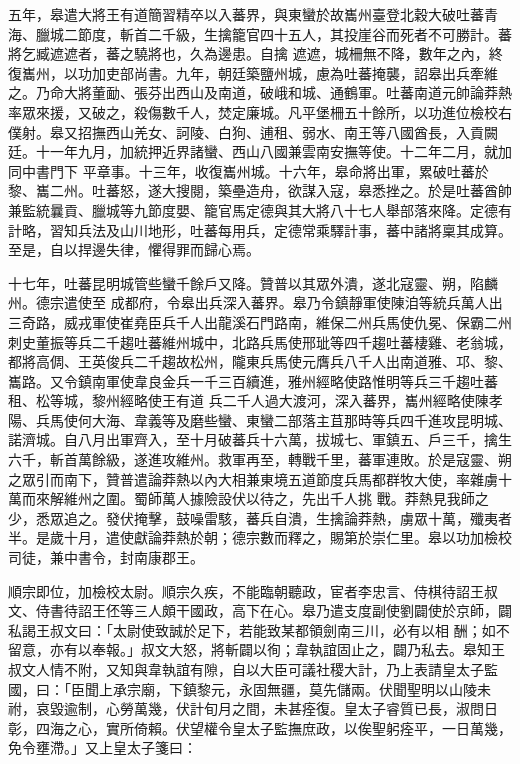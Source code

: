 \begin{pinyinscope}
 五年，皋遣大將王有道簡習精卒以入蕃界，與東蠻於故巂州臺登北穀大破吐蕃青海、臘城二節度，斬首二千級，生擒籠官四十五人，其投崖谷而死者不可勝計。蕃將乞臧遮遮者，蕃之驍將也，久為邊患。自擒
 遮遮，城柵無不降，數年之內，終復巂州，以功加吏部尚書。九年，朝廷築鹽州城，慮為吐蕃掩襲，詔皋出兵牽維之。乃命大將董勔、張芬出西山及南道，破峨和城、通鶴軍。吐蕃南道元帥論莽熱率眾來援，又破之，殺傷數千人，焚定廉城。凡平堡柵五十餘所，以功進位檢校右僕射。皋又招撫西山羌女、訶陵、白狗、逋租、弱水、南王等八國酋長，入貢闕廷。十一年九月，加統押近界諸蠻、西山八國兼雲南安撫等使。十二年二月，就加同中書門下
 平章事。十三年，收復巂州城。十六年，皋命將出軍，累破吐蕃於黎、巂二州。吐蕃怒，遂大搜閱，築壘造舟，欲謀入寇，皋悉挫之。於是吐蕃酋帥兼監統曩貢、臘城等九節度嬰、籠官馬定德與其大將八十七人舉部落來降。定德有計略，習知兵法及山川地形，吐蕃每用兵，定德常乘驛計事，蕃中諸將稟其成算。至是，自以捍邊失律，懼得罪而歸心焉。



 十七年，吐蕃昆明城管些蠻千餘戶又降。贊普以其眾外潰，遂北寇靈、朔，陷麟州。德宗遣使至
 成都府，令皋出兵深入蕃界。皋乃令鎮靜軍使陳洎等統兵萬人出三奇路，威戎軍使崔堯臣兵千人出龍溪石門路南，維保二州兵馬使仇冕、保霸二州刺史董振等兵二千趨吐蕃維州城中，北路兵馬使邢玼等四千趨吐蕃棲雞、老翁城，都將高倜、王英俊兵二千趨故松州，隴東兵馬使元膺兵八千人出南道雅、邛、黎、巂路。又令鎮南軍使韋良金兵一千三百續進，雅州經略使路惟明等兵三千趨吐蕃租、松等城，黎州經略使王有道
 兵二千人過大渡河，深入蕃界，巂州經略使陳孝陽、兵馬使何大海、韋義等及磨些蠻、東蠻二部落主苴那時等兵四千進攻昆明城、諾濟城。自八月出軍齊入，至十月破蕃兵十六萬，拔城七、軍鎮五、戶三千，擒生六千，斬首萬餘級，遂進攻維州。救軍再至，轉戰千里，蕃軍連敗。於是寇靈、朔之眾引而南下，贊普遣論莽熱以內大相兼東境五道節度兵馬都群牧大使，率雜虜十萬而來解維州之圍。蜀師萬人據險設伏以待之，先出千人挑
 戰。莽熱見我師之少，悉眾追之。發伏掩擊，鼓噪雷駭，蕃兵自潰，生擒論莽熱，虜眾十萬，殲夷者半。是歲十月，遣使獻論莽熱於朝；德宗數而釋之，賜第於崇仁里。皋以功加檢校司徒，兼中書令，封南康郡王。



 順宗即位，加檢校太尉。順宗久疾，不能臨朝聽政，宦者李忠言、侍棋待詔王叔文、侍書待詔王伾等三人頗干國政，高下在心。皋乃遣支度副使劉闢使於京師，闢私謁王叔文曰：「太尉使致誠於足下，若能致某都領劍南三川，必有以相
 酬；如不留意，亦有以奉報。」叔文大怒，將斬闢以徇；韋執誼固止之，闢乃私去。皋知王叔文人情不附，又知與韋執誼有隙，自以大臣可議社稷大計，乃上表請皇太子監國，曰：「臣聞上承宗廟，下鎮黎元，永固無疆，莫先儲兩。伏聞聖明以山陵未祔，哀毀逾制，心勞萬幾，伏計旬月之間，未甚痊復。皇太子睿質已長，淑問日彰，四海之心，實所倚賴。伏望權令皇太子監撫庶政，以俟聖躬痊平，一日萬幾，免令壅滯。」又上皇太子箋曰：




\end{pinyinscope}
